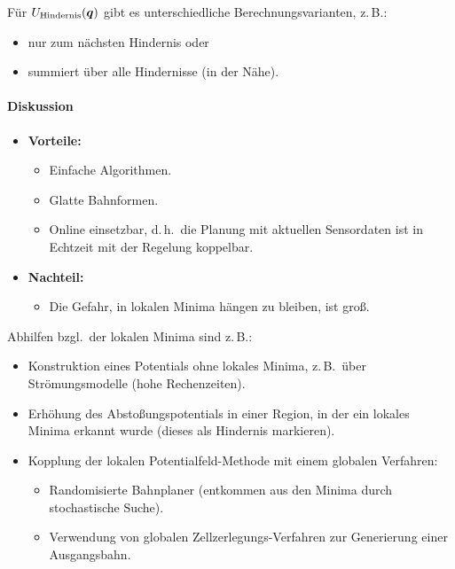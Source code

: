 \documentclass[a4paper, 11pt, accentcolor = tud3b]{tudreport}
\makeatletter
\newcommand{\vecnospacing}[1]{\boldsymbol{#1}}
\renewcommand{\vec}[1]{\vecnospacing{#1} \ifthenelse{\equal{#1}{A} \OR \equal{#1}{n} \OR \equal{#1}{m} \OR \equal{#1}{B} \OR \equal{#1}{q} \OR \equal{#1}{F} \OR \equal{#1}{J}}{}{\@ifnextchar({}{\@ifnextchar[{}{\@ifnextchar\{{}{\@ifnextchar\,{}{\!}}}}}}
\renewcommand{\dh}{d.\,h.~}
\newcommand{\bzgl}{bzgl.~}
\newcommand{\zB}{z.\,B.~}
\makeatother
\begin{document}
					Für \( U_\text{Hindernis}(\vec{q}) \) gibt es unterschiedliche Berechnungsvarianten, z.\,B.:
					\begin{itemize}
						\item nur zum nächsten Hindernis oder
						\item summiert über alle Hindernisse (in der Nähe).
					\end{itemize}
				
				\paragraph{Diskussion}
					\begin{itemize}
						\item \textbf{Vorteile:}
							\begin{itemize}
								\item Einfache Algorithmen.
								\item Glatte Bahnformen.
								\item Online einsetzbar, \dh die Planung mit aktuellen Sensordaten ist in Echtzeit mit der Regelung koppelbar.
							\end{itemize}
						\item \textbf{Nachteil:}
							\begin{itemize}
								\item Die Gefahr, in lokalen Minima hängen zu bleiben, ist groß.
							\end{itemize}
					\end{itemize}
				
					Abhilfen \bzgl der lokalen Minima sind z.\,B.:
					\begin{itemize}
						\item Konstruktion eines Potentials ohne lokales Minima, \zB über Strömungsmodelle (hohe Rechenzeiten).
						\item Erhöhung des Abstoßungspotentials in einer Region, in der ein lokales Minima erkannt wurde (dieses als Hindernis markieren).
						\item Kopplung der lokalen Potentialfeld-Methode mit einem globalen Verfahren:
							\begin{itemize}
								\item Randomisierte Bahnplaner (entkommen aus den Minima durch stochastische Suche).
								\item Verwendung von globalen Zellzerlegungs-Verfahren zur Generierung einer Ausgangsbahn.
							\end{itemize}
					\end{itemize}
\end{document}
